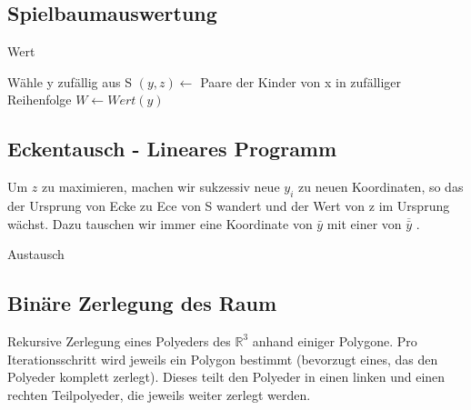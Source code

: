 \subsection{Spielbaumauswertung}
\begin{algorithm}[H]
	\caption{Wert}

	\BlankLine
	
	Wähle y zufällig aus S \newline
	$(y,z) \longleftarrow $ Paare der Kinder von x in zufälliger Reihenfolge\newline
	$W \longleftarrow Wert(y)$ \newline
\end{algorithm}

\subsection{Eckentausch - Lineares Programm}
Um $z$ zu maximieren, machen wir sukzessiv neue $y_i$ zu neuen Koordinaten, so das der Ursprung von Ecke zu Ece von S wandert und der Wert von z im Ursprung wächst. Dazu tauschen wir immer eine Koordinate von $\bar{y}$ mit einer von $\overline{\bar{y}}$ .

\begin{algorithm}[H]
	\caption{Austausch}

	\BlankLine
	
		
\end{algorithm}

\subsection{Binäre Zerlegung des Raum}
Rekursive Zerlegung eines Polyeders des \(\mathbb{R}^3\) anhand einiger Polygone. Pro Iterationsschritt wird jeweils ein Polygon bestimmt (bevorzugt eines, das den Polyeder komplett zerlegt). Dieses teilt den Polyeder in einen linken und einen rechten Teilpolyeder, die jeweils weiter zerlegt werden.

